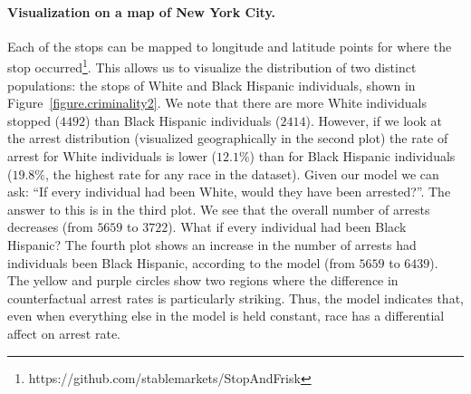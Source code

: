 \paragraph{Visualization on a map of New York City.}
Each of the stops can be mapped to longitude and latitude points for
where the stop
occurred\footnote{https://github.com/stablemarkets/StopAndFrisk}. This allows us to visualize the distribution of two distinct populations: the stops of White and Black Hispanic individuals, shown in Figure~\ref{figure.criminality2}. We note that there are more White individuals stopped ($4492$) than Black Hispanic individuals ($2414$). However, if we look at the arrest distribution (visualized geographically in the second plot) the rate of arrest for White individuals is lower ($12.1\%$) than for Black Hispanic individuals ($19.8\%$, the highest rate for any race in the dataset). Given our model we can ask: ``If every individual had been White, would they have been arrested?''. The answer to this is in the third plot. We see that the overall number of arrests decreases (from $5659$ to $3722$). What if every individual had been Black Hispanic? The fourth plot shows an increase in the number of arrests had individuals been Black Hispanic, according to the model (from $5659$ to $6439$). The yellow and purple circles show two regions where the difference in counterfactual arrest rates is particularly striking. Thus, the model indicates that, even when everything else in the model is held constant, race has a differential affect on arrest rate.



